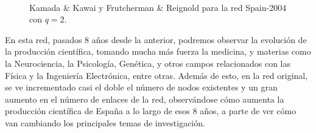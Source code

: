 \documentclass[paper=a4, fontsize=11pt]{article} %
\numberwithin{equation}{section} %
\numberwithin{figure}{section} %
\numberwithin{table}{section} %
\begin{document}
\begin{figure}[H]
    \centering
    \mbox {
      \qquad
    }
    \caption{Kamada \& Kawai y Frutcherman \& Reignold para la red Spain-2004 con $q=2$.}
    \label{spq204}
\end{figure}

En esta red, pasados 8 años desde la anterior, podremos observar la evolución de la producción científica, tomando mucha más fuerza la medicina, y materias como la Neurociencia, la Psicología, Genética, y otros campos relacionados con las Física y la Ingeniería Electrónica, entre otras. Además de esto, en la red original, se ve incrementado casi el doble el número de nodos existentes y un gran aumento en el número de enlaces de la red, observándose cómo aumenta la producción científica de España a lo largo de esos 8 años, a parte de ver cómo van cambiando los principales temas de investigación.
\end{document}

